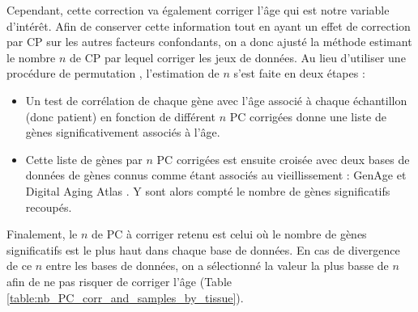 Cependant, cette correction va également corriger l'âge qui est notre variable d'intérêt. Afin de conserver cette information tout en ayant un effet de correction par CP sur les autres facteurs confondants, on a donc ajusté la méthode estimant le nombre $n$ de CP par lequel corriger les jeux de données. Au lieu d'utiliser une procédure de permutation , l'estimation de $n$ s'est faite en deux étapes :
\begin{itemize}
    \item Un test de corrélation de chaque gène avec l'âge associé à chaque échantillon (donc patient) en fonction de différent $n$ PC corrigées donne une liste de gènes significativement associés à l'âge.
    \item Cette liste de gènes par $n$ PC corrigées est ensuite croisée avec deux bases de données de gènes connus comme étant associés au vieillissement : GenAge  et Digital Aging Atlas . Y sont alors compté le nombre de gènes significatifs recoupés.
\end{itemize}
Finalement, le $n$ de PC à corriger retenu est celui où le nombre de gènes significatifs est le plus haut dans chaque base de données. En cas de divergence de ce $n$ entre les bases de données, on a sélectionné la valeur la plus basse de $n$ afin de ne pas risquer de corriger l'âge (Table \ref{table:nb_PC_corr_and_samples_by_tissue}).


